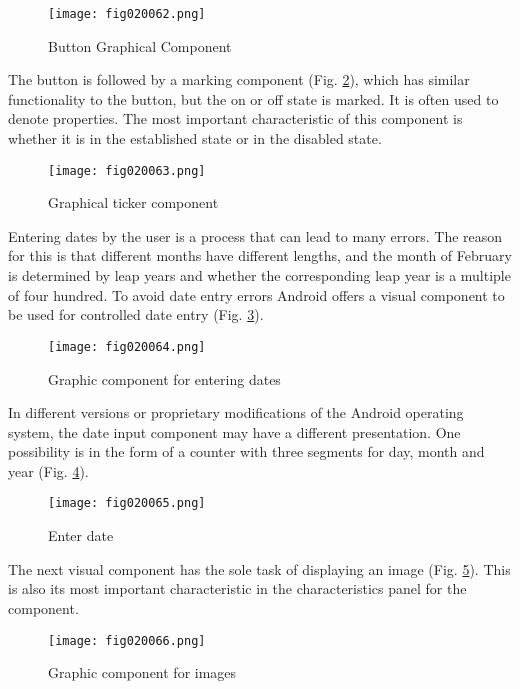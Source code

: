 \begin{figure}[H]
   \centering
   \texttt{[image: fig020062.png]}
   \caption{Button Graphical Component}
\label{fig020062}
\end{figure}

The button is followed by a marking component (Fig. \ref{fig020063}), which has similar functionality to the button, but the on or off state is marked. It is often used to denote properties. The most important characteristic of this component is whether it is in the established state or in the disabled state.

\begin{figure}[H]
   \centering
   \texttt{[image: fig020063.png]}
   \caption{Graphical ticker component}
\label{fig020063}
\end{figure}

Entering dates by the user is a process that can lead to many errors. The reason for this is that different months have different lengths, and the month of February is determined by leap years and whether the corresponding leap year is a multiple of four hundred. To avoid date entry errors Android offers a visual component to be used for controlled date entry (Fig. \ref{fig020064}).

\begin{figure}[H]
   \centering
   \texttt{[image: fig020064.png]}
   \caption{Graphic component for entering dates}
\label{fig020064}
\end{figure}

In different versions or proprietary modifications of the Android operating system, the date input component may have a different presentation. One possibility is in the form of a counter with three segments for day, month and year (Fig. \ref{fig020065}).

\begin{figure}[H]
   \centering
   \texttt{[image: fig020065.png]}
   \caption{Enter date}
\label{fig020065}
\end{figure}

The next visual component has the sole task of displaying an image (Fig. \ref{fig020066}). This is also its most important characteristic in the characteristics panel for the component.

\begin{figure}[H]
   \centering
   \texttt{[image: fig020066.png]}
   \caption{Graphic component for images}
\label{fig020066}
\end{figure}

